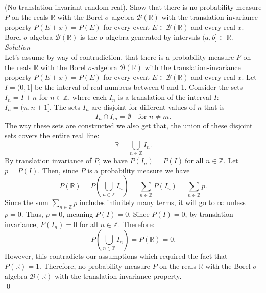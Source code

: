 \documentclass[10pt]{amsart}
\begin{document}
  (No translation-invariant random real). Show that there is no probability measure $P$ on the reals $\mathds{R}$ with the Borel
$\sigma$-algebra $\mathcal{B}(\mathds{R})$ with the translation-invariance property $P(E + x) = P(E)$ for every event $E \in \mathcal{B}(\mathds{R})$ and every real $x$. Borel $\sigma$-algebra $\mathcal{B}(\mathds{R})$ is the $\sigma$-algebra generated by intervals $(a,b] \subset \mathds{R}$.
\\
\textit{ Solution} \\
Let's assume by way of contradiction, that there is a probability measure $P$ on the reals $\mathds{R}$ with the Borel $\sigma$-algebra
$\mathcal{B}(\mathds{R})$ with the translation-invariance property $P(E + x) = P(E)$ for every event $E \in \mathcal{B}(\mathds{R})$ and every real $x$.
Let $I = (0,1]$ be the interval of real numbers between 0 and 1.
Consider the sets $I_n = I + n$ for $n \in \mathds{Z}$, where each $I_n$ is a translation of the interval $I$: $I_n = (n, n+1]$.
The sets \(I_n\) are disjoint for different values of $n$ that is
$$
I_n \cap I_m = \emptyset \quad \text{for } n \neq m.
$$
The way these sets are constructed we also get that, the union of these disjoint sets covers the entire real line:
$$
\mathbb{R} = \bigcup_{n \in \mathbb{Z}} I_n.
$$
\noindent
By translation invariance of $P$, we have $P(I_n) = P(I) \: \text{for all } n \in \mathbb{Z}$.
Let $p = P(I)$. Then, since $P$ is a probability measure we have
$$
P(\mathbb{R}) = P\left( \bigcup_{n \in \mathbb{Z}} I_n \right) = \sum_{n \in \mathbb{Z}} P(I_n) = \sum_{n \in \mathbb{Z}} p.
$$
Since the sum $\sum_{n \in \mathbb{Z}} p$ includes infinitely many terms, it will go to $\infty$ unless $p = 0$. Thus, $p = 0$, meaning $P(I) = 0$.
Since $P(I) = 0$, by translation invariance, $P(I_n) = 0$ for all $n \in \mathbb{Z}$. Therefore:
$$
P\left( \bigcup_{n \in \mathbb{Z}} I_n \right) = P(\mathbb{R}) = 0.
$$
However, this contradicts our assumptions which required the fact that $P(\mathbb{R}) = 1$.
Therefore, no probability measure $P$ on the reals $\mathds{R}$ with the Borel $\sigma$-algebra
$\mathcal{B}(\mathds{R})$ with the translation-invariance property. \\
\qed
\end{document}
